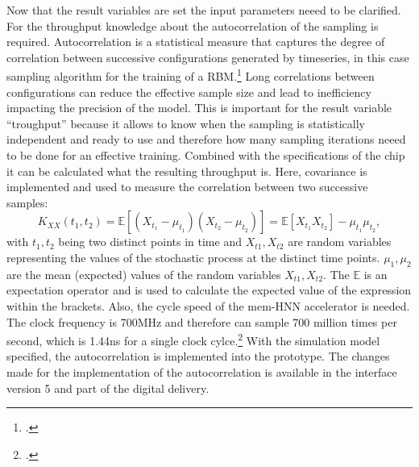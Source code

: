 Now that the result variables are set the input parameters neeed to be clarified. 
For the throughput knowledge about the autocorrelation of the sampling is required.
Autocorrelation is a statistical measure that captures the degree of correlation between successive configurations generated by timeseries, in this case sampling algorithm for the training of a \ac{RBM}.\footcite[cf.][1-6]{tanakaReductionAutocorrelationHMC2017}
Long correlations between configurations can reduce the effective sample size and lead to inefficiency impacting the precision of the model.
This is important for the result variable ``troughput'' because it allows to know when the sampling is statistically independent and ready to use and therefore how many sampling iterations neeed to be done for an effective training. 
Combined with the specifications of the chip it can be calculated what the resulting throughput is.
Here, covariance is implemented and used to measure the correlation between two successive samples:
\begin{equation}
    K_{XX}(t_1, t_2) = \mathbb{E}[(X_{t_1} - \mu_{t_1})(X_{t_2} - \mu_{t_2})] = \mathbb{E}[X_{t_1} X_{t_2}] - \mu_{t_1}\mu_{t_2},
\end{equation}
with \(t_1,t_2\) being two distinct points in time and \(X_{t1},X_{t2}\) are random variables representing the values of the stochastic process at the distinct time points. 
\(\mu_1,\mu_2\) are the mean (expected) values of the random variables \(X_{t1},X_{t2}\). 
The \(\mathbb{E}\) is an expectation operator and is used to calculate the expected value of the expression within the brackets.
Also, the cycle speed of the \ac{mem-HNN} accelerator is needed. 
The clock frequency is 700MHz and therefore can sample 700 million times per second, which is 1.44ns for a single clock cylce.\footcite[cf. table1][7-8]{caiPowerefficientCombinatorialOptimization2020} 
With the simulation model specified, the autocorrelation is implemented into the prototype. 
The changes made for the implementation of the autocorrelation is available in the interface version 5 and part of the digital delivery. 

